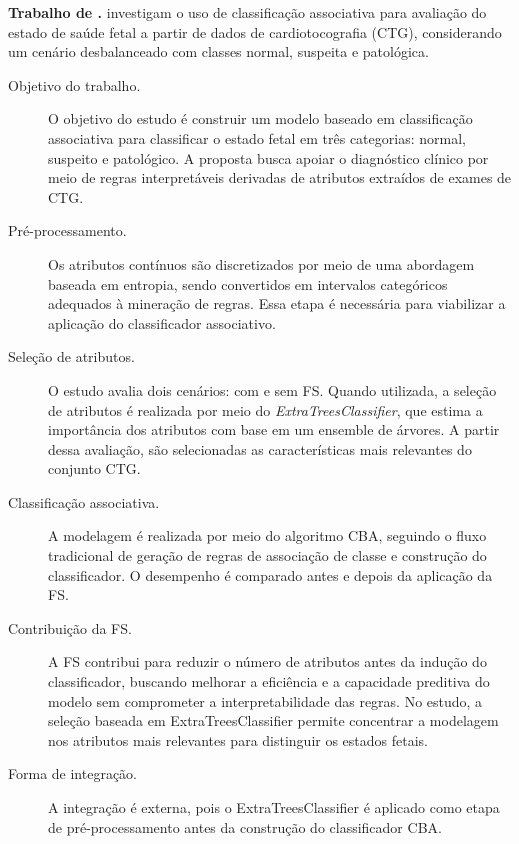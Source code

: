 \textbf{Trabalho de .} 
 investigam o uso de classificação associativa para avaliação do estado de saúde fetal a partir de dados de cardiotocografia (CTG), considerando um cenário desbalanceado com classes normal, suspeita e patológica.

\begin{description}
    \item[Objetivo do trabalho.] O objetivo do estudo é construir um modelo baseado em classificação associativa para classificar o estado fetal em três categorias: normal, suspeito e patológico. A proposta busca apoiar o diagnóstico clínico por meio de regras interpretáveis derivadas de atributos extraídos de exames de CTG.

    \item[Pré-processamento.] Os atributos contínuos são discretizados por meio de uma abordagem baseada em entropia, sendo convertidos em intervalos categóricos adequados à mineração de regras. Essa etapa é necessária para viabilizar a aplicação do classificador associativo.

    \item[Seleção de atributos.] O estudo avalia dois cenários: com e sem FS. Quando utilizada, a seleção de atributos é realizada por meio do \textit{ExtraTreesClassifier}, que estima a importância dos atributos com base em um ensemble de árvores. A partir dessa avaliação, são selecionadas as características mais relevantes do conjunto CTG.

    \item[Classificação associativa.] A modelagem é realizada por meio do algoritmo CBA, seguindo o fluxo tradicional de geração de regras de associação de classe e construção do classificador. O desempenho é comparado antes e depois da aplicação da FS.

    \item[Contribuição da FS.] A FS contribui para reduzir o número de atributos antes da indução do classificador, buscando melhorar a eficiência e a capacidade preditiva do modelo sem comprometer a interpretabilidade das regras. No estudo, a seleção baseada em ExtraTreesClassifier permite concentrar a modelagem nos atributos mais relevantes para distinguir os estados fetais.

    \item[Forma de integração.] A integração é externa, pois o ExtraTreesClassifier é aplicado como etapa de pré-processamento antes da construção do classificador CBA.
\end{description}


